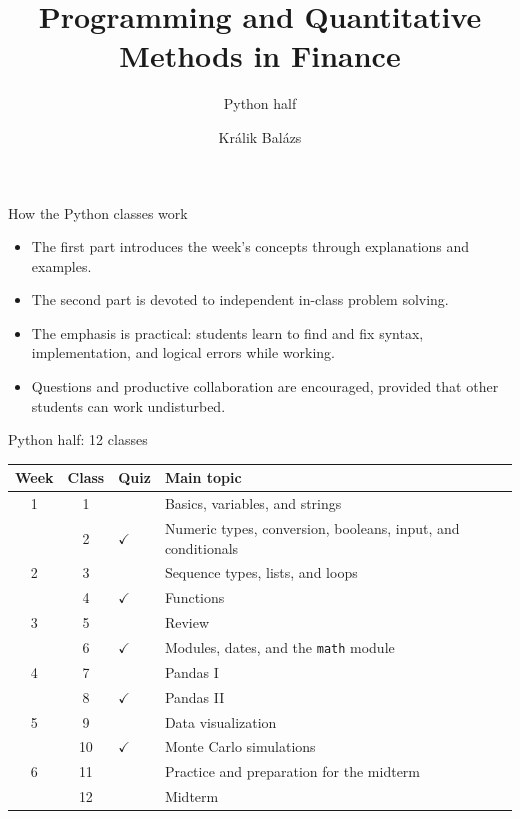 \documentclass[aspectratio=169,11pt]{beamer}
\title{Programming and Quantitative Methods in Finance}
\subtitle{Python half}
\author{Králik Balázs}
\date{}
\begin{document}
\begin{frame}{How the Python classes work}
  \begin{itemize}
    \item The first part introduces the week's concepts through explanations
          and examples.
    \item The second part is devoted to independent in-class problem solving.
    \item The emphasis is practical: students learn to find and fix syntax,
          implementation, and logical errors while working.
    \item Questions and productive collaboration are encouraged, provided that
          other students can work undisturbed.
  \end{itemize}
\end{frame}

\begin{frame}{Python half: 12 classes}
  \small
  \begin{tabular}{ccll}
    \toprule
    Week & Class & Quiz & Main topic \\
    \midrule
    1 & 1  &           & Basics, variables, and strings \\
      & 2  & $\checkmark$ & Numeric types, conversion, booleans, input, and conditionals \\
    2 & 3  &           & Sequence types, lists, and loops \\
      & 4  & $\checkmark$ & Functions \\
    3 & 5  &           & Review \\
      & 6  & $\checkmark$ & Modules, dates, and the \texttt{math} module \\
    4 & 7  &           & Pandas I \\
      & 8  & $\checkmark$ & Pandas II \\
    5 & 9  &           & Data visualization \\
      & 10 & $\checkmark$ & Monte Carlo simulations \\
    6 & 11 &          & Practice and preparation for the midterm \\
      & 12 &          & Midterm \\
    \bottomrule
  \end{tabular}
\end{frame}
\end{document}

